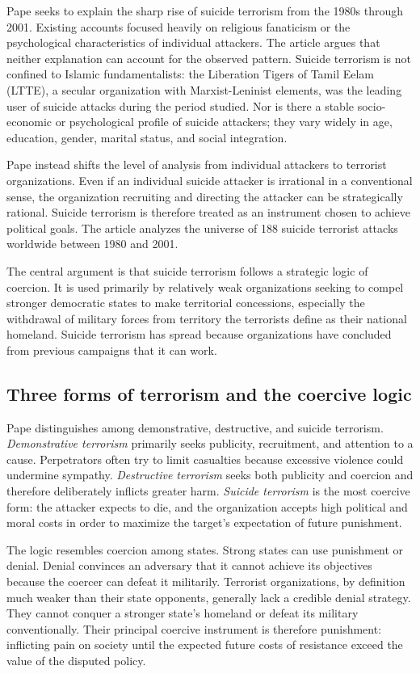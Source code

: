 Pape seeks to explain the sharp rise of suicide terrorism from the 1980s through 2001. Existing accounts focused heavily on religious fanaticism or the psychological characteristics of individual attackers. The article argues that neither explanation can account for the observed pattern. Suicide terrorism is not confined to Islamic fundamentalists: the Liberation Tigers of Tamil Eelam (LTTE), a secular organization with Marxist-Leninist elements, was the leading user of suicide attacks during the period studied. Nor is there a stable socio-economic or psychological profile of suicide attackers; they vary widely in age, education, gender, marital status, and social integration.

Pape instead shifts the level of analysis from individual attackers to terrorist organizations. Even if an individual suicide attacker is irrational in a conventional sense, the organization recruiting and directing the attacker can be strategically rational. Suicide terrorism is therefore treated as an instrument chosen to achieve political goals. The article analyzes the universe of 188 suicide terrorist attacks worldwide between 1980 and 2001.

The central argument is that suicide terrorism follows a strategic logic of coercion. It is used primarily by relatively weak organizations seeking to compel stronger democratic states to make territorial concessions, especially the withdrawal of military forces from territory the terrorists define as their national homeland. Suicide terrorism has spread because organizations have concluded from previous campaigns that it can work.

\subsection{Three forms of terrorism and the coercive logic}

Pape distinguishes among demonstrative, destructive, and suicide terrorism. \textit{Demonstrative terrorism} primarily seeks publicity, recruitment, and attention to a cause. Perpetrators often try to limit casualties because excessive violence could undermine sympathy. \textit{Destructive terrorism} seeks both publicity and coercion and therefore deliberately inflicts greater harm. \textit{Suicide terrorism} is the most coercive form: the attacker expects to die, and the organization accepts high political and moral costs in order to maximize the target's expectation of future punishment.

The logic resembles coercion among states. Strong states can use punishment or denial. Denial convinces an adversary that it cannot achieve its objectives because the coercer can defeat it militarily. Terrorist organizations, by definition much weaker than their state opponents, generally lack a credible denial strategy. They cannot conquer a stronger state's homeland or defeat its military conventionally. Their principal coercive instrument is therefore punishment: inflicting pain on society until the expected future costs of resistance exceed the value of the disputed policy.

